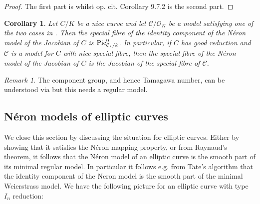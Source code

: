 \documentclass[12pt]{amsart}
\numberwithin{equation}{section}
\newtheorem{cor}[equation]{Corollary}
\theoremstyle{remark}
\newtheorem{remark}[equation]{Remark}
\theoremstyle{definition}
\theoremstyle{definition}
\theoremstyle{definition}
\theoremstyle{definition}
\theoremstyle{definition}
\theoremstyle{definition}
\begin{document}
\begin{proof}
The first part is \cite[Theorem 9.5.4 (b)]{MR1045822} whilst op. cit. Corollary 9.7.2 is the second part.
\end{proof}

\begin{cor}
Let $C/K$ be a nice curve and let $\mathcal{C}/\mathcal{O}_K$ be a model satisfying one of the two cases in . Then the special fibre of  the identity component of the N\'{e}ron model of the Jacobian of $C$ is $\textup{Pic}^0_{\mathcal{C}_k/k}$. In particular, if $C$ has good reduction and $\mathcal{C}$ is a model for $C$ with nice special fibre, then the special fibre of the N\'{e}ron model of the Jacobian of $C$ is the Jacobian of the  special fibre of $\mathcal{C}$. 
\end{cor}

\begin{remark}
The component group, and hence Tamagawa number, can be understood via \cite[Theorem 9.6.1]{MR1045822} but this needs a regular model. 
\end{remark}

\subsection{N\'{e}ron  models of elliptic curves}

We close this section by discussing the situation for elliptic curves. Either by showing that it satisfies the N\'{e}ron mapping property, or from Raynaud's theorem, it follows that the N\'{e}ron model of an elliptic curve is the smooth part of its minimal regular model. In particular it follows e.g. from Tate's algorithm that the identity component of the Neron model is the smooth part of the minimal Weierstrass model. We have the following picture for an elliptic curve with type $I_n$ reduction:

\newpage 
\end{document}
